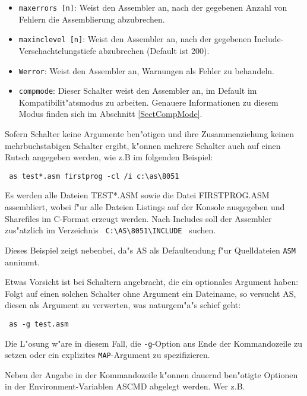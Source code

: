 \documentclass[12pt,a4paper,twoside]{report}
\newcommand{\tty}[1]{{\tt #1}}
\begin{document}
\begin{itemize}
{      Position nicht im Standardformat von AS, sondern in einem dem GNU
      C-Compiler entlehnten Format anzeigen.  Dies erleichtert die
      Integration von AS in f"ur dieses Format ausgelegte Umgebungen,
      unterdr"uckt aber gleichzeitig die Anzeige der pr"azisen
      Fehlerposition innerhalb Makror"umpfen!}
\item{{\tt maxerrors [n]}: Weist den Assembler an, nach der gegebenen
      Anzahl von Fehlern die Assemblierung abzubrechen.}
\item{{\tt maxinclevel [n]}: Weist den Assembler an, nach der gegebenen
      Include-Verschachtelungstiefe abzubrechen (Default ist 200).}
\item{{\tt Werror}: Weist den Assembler an, Warnungen als Fehler zu
      behandeln.}
\item{\tty{compmode}: Dieser Schalter weist den Assembler an, im Default
      im Kompatibilit"atsmodus zu arbeiten.  Genauere Informationen zu
      diesem Modus finden sich im Abschnitt \ref{SectCompMode}.}
\end{itemize}
Sofern Schalter keine Argumente ben"otigen und ihre Zusammenziehung
keinen mehrbuchstabigen Schalter ergibt, k"onnen mehrere Schalter
auch auf einen Rutsch angegeben werden, wie z.B im folgenden Beispiel:
\begin{verbatim}
 as test*.asm firstprog -cl /i c:\as\8051
\end{verbatim}
Es werden alle Dateien TEST*.ASM sowie die Datei FIRSTPROG.ASM
assembliert, wobei f"ur alle Dateien Listings auf der Konsole
ausgegeben und Sharefiles im C-Format erzeugt werden.  Nach Includes
soll der Assembler zus"atzlich im Verzeichnis \verb! C:\AS\8051\INCLUDE !
suchen.
\par
Dieses Beispiel zeigt nebenbei, da"s AS als Defaultendung f"ur Quelldateien
\tty{ASM} annimmt.
\par
Etwas Vorsicht ist bei Schaltern angebracht, die ein optionales Argument
haben: Folgt auf einen solchen Schalter ohne Argument ein Dateiname, so
versucht AS, diesen als Argument zu verwerten, was naturgem"a"s schief
geht:
\begin{verbatim}
 as -g test.asm
\end{verbatim}
Die L"osung w"are in diesem Fall, die \tty{-g}-Option ans Ende der
Kommandozeile zu setzen oder ein explizites \tty{MAP}-Argument zu
spezifizieren.
\par
Neben der Angabe in der Kommandozeile k"onnen dauernd ben"otigte
Optionen in der Environment-Variablen ASCMD abgelegt werden. Wer z.B.
\end{document}
